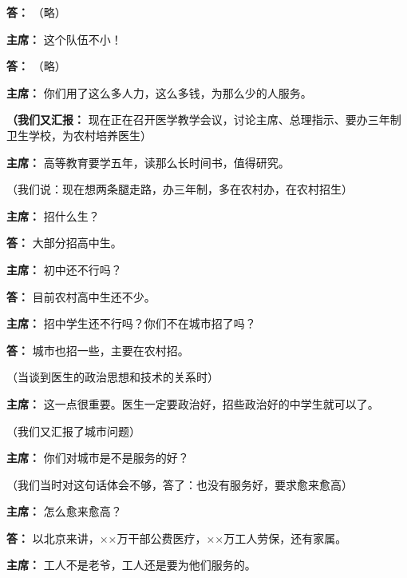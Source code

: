 \begin{duihua}
\item[\textbf{答：}] （略）

\item[\textbf{主席：}] 这个队伍不小！

\item[\textbf{答：}] （略）

\item[\textbf{主席：}] 你们用了这么多人力，这么多钱，为那么少的人服务。

\item[\textbf{（我们又汇报：}] 现在正在召开医学教学会议，讨论主席、总理指示、要办三年制卫生学校，为农村培养医生）

\item[\textbf{主席：}] 高等教育要学五年，读那么长时间书，值得研究。

（我们说：现在想两条腿走路，办三年制，多在农村办，在农村招生）

\item[\textbf{主席：}] 招什么生？

\item[\textbf{答：}] 大部分招高中生。

\item[\textbf{主席：}] 初中还不行吗？

\item[\textbf{答：}] 目前农村高中生还不少。

\item[\textbf{主席：}] 招中学生还不行吗？你们不在城市招了吗？

\item[\textbf{答：}] 城市也招一些，主要在农村招。

（当谈到医生的政治思想和技术的关系时）

\item[\textbf{主席：}] 这一点很重要。医生一定要政治好，招些政治好的中学生就可以了。

（我们又汇报了城市问题）

\item[\textbf{主席：}] 你们对城市是不是服务的好？

（我们当时对这句话体会不够，答了：也没有服务好，要求愈来愈高）

\item[\textbf{主席：}] 怎么愈来愈高？

\item[\textbf{答：}] 以北京来讲，××万干部公费医疗，××万工人劳保，还有家属。

\item[\textbf{主席：}] 工人不是老爷，工人还是要为他们服务的。


\end{duihua}
